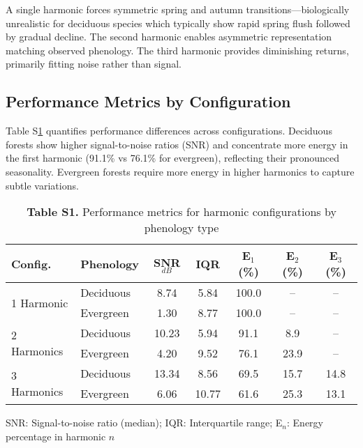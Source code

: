 \documentclass[utf8]{frontiers_suppmat}
\begin{document}
A single harmonic forces symmetric spring and autumn transitions—biologically unrealistic for deciduous species which typically show rapid spring flush followed by gradual decline. The second harmonic enables asymmetric representation matching observed phenology. The third harmonic provides diminishing returns, primarily fitting noise rather than signal.

\subsection{Performance Metrics by Configuration}

Table S\ref{tab:harmonic_metrics} quantifies performance differences across configurations. Deciduous forests show higher signal-to-noise ratios (SNR) and concentrate more energy in the first harmonic (91.1\% vs 76.1\% for evergreen), reflecting their pronounced seasonality. Evergreen forests require more energy in higher harmonics to capture subtle variations.

\begin{table}[H]
    \centering
    \caption{\textbf{Table S1.} Performance metrics for harmonic configurations by phenology type}
    \begin{tabular}{llccccc}
        \hline
        \textbf{Config.} & \textbf{Phenology} & \textbf{SNR$_{dB}$} & \textbf{IQR} & \textbf{E$_1$ (\%)} & \textbf{E$_2$ (\%)} & \textbf{E$_3$ (\%)} \\
        \hline
        \multirow{2}{*}{1 Harmonic}
            & Deciduous & 8.74 & 5.84 & 100.0 & -- & -- \\
            & Evergreen & 1.30 & 8.77 & 100.0 & -- & -- \\
        \hline
        \multirow{2}{*}{2 Harmonics}
            & Deciduous & 10.23 & 5.94 & 91.1 & 8.9 & -- \\
            & Evergreen & 4.20 & 9.52 & 76.1 & 23.9 & -- \\
        \hline
        \multirow{2}{*}{3 Harmonics}
            & Deciduous & 13.34 & 8.56 & 69.5 & 15.7 & 14.8 \\
            & Evergreen & 6.06 & 10.77 & 61.6 & 25.3 & 13.1 \\
        \hline
    \end{tabular}
    \label{tab:harmonic_metrics}
    \vspace{2mm}
    \small{SNR: Signal-to-noise ratio (median); IQR: Interquartile range; E$_n$: Energy percentage in harmonic $n$}
\end{table}
\end{document}
